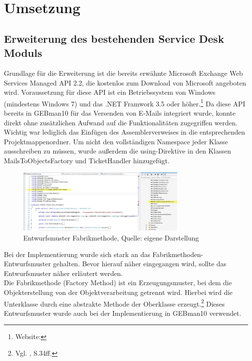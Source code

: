 \section{Umsetzung}

\subsection{Erweiterung des bestehenden Service Desk Moduls}
\noindent
Grundlage für die Erweiterung ist die bereits erwähnte Microsoft Exchange Web Services Managed API 2.2, die kostenlos zum Download von Microsoft angeboten wird. Voraussetzung für diese API ist ein Betriebssystem von Windows (mindestens Windows 7) und das .NET Framwork 3.5 oder höher.\footnote{Website:\cite{DownloadAPI}}\newline 
Da diese API bereits in GEBman10 für das Versenden von E-Mails integriert wurde, konnte direkt ohne zusätzlichen Aufwand auf die Funktionalitäten zugegriffen werden. Wichtig war lediglich das Einfügen des Assemblerverweises in die entsprechenden Projektmappenordner. Um nicht den vollständigen Namespace jeder Klasse ausschreiben zu müssen, wurde außerdem die using-Direktive in den Klassen MailsToObjectsFactory und TicketHandler hinzugefügt.

\begin{figure}[h!]
\centering
\includegraphics[width=0.75\textwidth]{Abbildungen/Screenshot_Verweise.pdf}
	\caption[Verweise]{Entwurfsmuster Fabrikmethode, Quelle: eigene Darstellung}
	\label{fig:Verweise}
\end{figure}

\noindent
Bei der Implementierung wurde sich stark an das Fabrikmethoden-Entwurfsmuster gehalten. Bevor hierauf näher eingegangen wird, sollte das Entwurfsmuster näher erläutert werden.\\
\noindent
Die Fabrikmethode (Factory Method) ist ein Erzeugungsmuster, bei dem die Objekterstellung von der Objektverarbeitung getrennt wird. Hierbei wird die Unterklasse durch eine abstrakte Methode der Oberklasse erzeugt.\footnote{Vgl. \citeauthor{PatternsKompakt} \citeyear{PatternsKompakt}, S.34ff.} Dieses Entwurfsmuster wurde auch bei der Implementierung in GEBman10 verwendet. 

